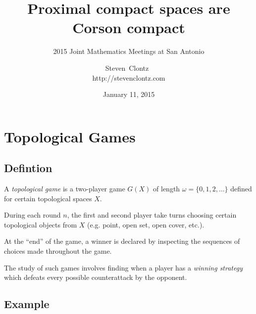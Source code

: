 \documentclass{beamer}
\title
{Proximal compact spaces are Corson compact}
\subtitle
{2015 Joint Mathematics Meetings at San Antonio} %
\author%
{Steven~Clontz~\\http://stevenclontz.com}%
\institute[Auburn University] %
{
  Department of Mathematics and Statistics\\
  Auburn University}
\date[15-01-11] %
{January 11, 2015}
\theoremstyle{definition}
\newcommand{\<}{\langle}
\renewcommand{\>}{\rangle}
\newcommand{\term}{\textit}
\begin{document}
\newcommand{\vspacing}{\vspace{1em}}
\newcommand{\vpause}{\pause\vspacing}

\begin{frame}
  \titlepage
\end{frame}

\section{Topological Games}

\subsection{Defintion}

\begin{frame}
  A \term{topological game} is a two-player game $G(X)$ of length
  $\omega=\{0,1,2,\dots\}$ defined for certain topological spaces $X$.

  \vpause

  During each round $n$, the first and second player take turns choosing
  certain topological objects from $X$ (e.g. point, open set, open cover, etc.).

  \vpause

  At the ``end'' of the game, a winner is declared by inspecting the sequences
  of choices made throughout the game.

  \vpause

  The study of such games involves finding when a player has a
  \term{winning strategy} which defeats every possible counterattack by
  the opponent.
\end{frame}

\subsection{Example}
\end{document}
